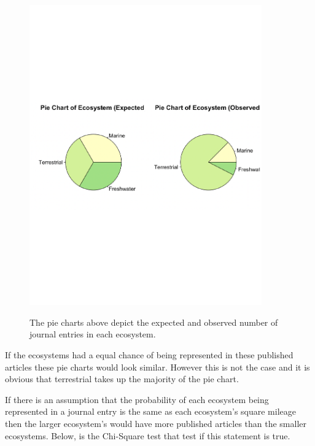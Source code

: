 \documentclass[12pt, letterpaper]{article}
\begin{document}
\begin{figure}[h]
\begin{center}
	\includegraphics[width=10cm]{pie-eco-1.pdf}
	\label{fig: Expected Frequency vs Observed Frequency}
	\caption{The pie charts above depict the expected and observed number of journal entries in each ecosystem.}
\end{center}
\end{figure}
If the ecosystems 
had a equal chance of being represented in these published articles these pie charts would look similar. However this is not the case and it is obvious that terrestrial takes up the majority of the pie chart. 

If there is an assumption that the probability of each ecosystem being represented in a journal entry is the same as each ecosystem's square mileage then the larger ecosystem's would have more published articles than the smaller ecosystems. Below, is the Chi-Square test that test if this statement is true. 
\end{document}
